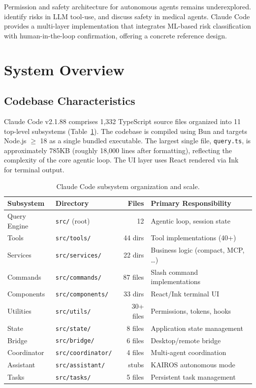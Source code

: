 \documentclass{article}
\begin{document}
Permission and safety architecture for autonomous agents remains underexplored. \citet{ruan2023identifying} identify risks in LLM tool-use, and \citet{shi2024ehragent} discuss safety in medical agents. Claude Code provides a multi-layer implementation that integrates ML-based risk classification with human-in-the-loop confirmation, offering a concrete reference design.

\section{System Overview}

\subsection{Codebase Characteristics}

Claude Code v2.1.88 comprises 1,332 TypeScript source files organized into 11 top-level subsystems (Table~\ref{tab:subsystems}). The codebase is compiled using Bun and targets Node.js $\geq$ 18 as a single bundled executable. The largest single file, \texttt{query.ts}, is approximately 785KB (roughly 18,000 lines after formatting), reflecting the complexity of the core agentic loop. The UI layer uses React rendered via Ink~\cite{ink2023} for terminal output.

\begin{table}[t]
\centering
\caption{Claude Code subsystem organization and scale.}
\label{tab:subsystems}
\small
\begin{tabular}{llrl}
\toprule
\textbf{Subsystem} & \textbf{Directory} & \textbf{Files} & \textbf{Primary Responsibility} \\
\midrule
Query Engine  & \texttt{src/} (root) & 12 & Agentic loop, session state \\
Tools         & \texttt{src/tools/} & 44 dirs & Tool implementations (40+) \\
Services      & \texttt{src/services/} & 22 dirs & Business logic (compact, MCP, \ldots) \\
Commands      & \texttt{src/commands/} & 87 files & Slash command implementations \\
Components    & \texttt{src/components/} & 33 dirs & React/Ink terminal UI \\
Utilities     & \texttt{src/utils/} & 30+ files & Permissions, tokens, hooks \\
State         & \texttt{src/state/} & 8 files & Application state management \\
Bridge        & \texttt{src/bridge/} & 6 files & Desktop/remote bridge \\
Coordinator   & \texttt{src/coordinator/} & 4 files & Multi-agent coordination \\
Assistant     & \texttt{src/assistant/} & stubs & KAIROS autonomous mode \\
Tasks         & \texttt{src/tasks/} & 5 files & Persistent task management \\
\bottomrule
\end{tabular}
\end{table}
\end{document}
